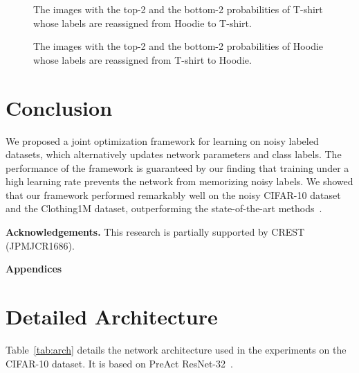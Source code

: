 \documentclass[10pt,twocolumn,letterpaper]{article}
\newcommand{\Tref}[1]{Table~\ref{#1}}
\begin{document}
\begin{figure}[tb]
  \centering
 \caption{The images with the top-2 and the bottom-2 probabilities of T-shirt whose labels are reassigned from Hoodie to T-shirt.}
 \label{fig:H2T}
 \vspace{-1mm}
\end{figure}

\begin{figure}[tb]
  \centering
 \caption{The images with the top-2 and the bottom-2 probabilities of Hoodie whose labels are reassigned from T-shirt to Hoodie.}
 \label{fig:T2H}
 \vspace{-5mm}
\end{figure}

\section{Conclusion}
We proposed a joint optimization framework for learning on noisy labeled datasets, which alternatively updates network parameters and class labels. The performance of the framework is guaranteed by our finding that training under a high learning rate prevents the network from memorizing noisy labels. We showed that our framework performed remarkably well on the noisy CIFAR-10 dataset and the Clothing1M dataset, outperforming the state-of-the-art methods~\cite{patrini2016making,vahdat2017toward}.

\vspace{2mm}\noindent\textbf{Acknowledgements. }
This research is partially supported by CREST (JPMJCR1686).

\newpage
{\small


}

\newpage
\appendix
{\Huge{\bf Appendices}}
\section{Detailed Architecture}\label{sec:arch}
\Tref{tab:arch} details the network architecture used in the experiments on the CIFAR-10 dataset. It is based on PreAct ResNet-32~\cite{he2016identity}.
\end{document}
